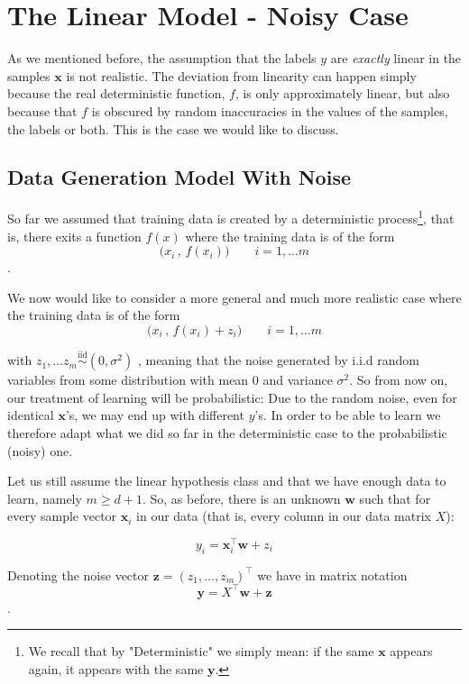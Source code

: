 \documentclass[11pt]{article}
\newcommand{\Tr}{\ensuremath{\top}}
\newcommand{\iid}{\stackrel{\text{iid}}{\sim}}
\begin{document}
\section{The Linear Model - Noisy Case }

As we mentioned before, the assumption that the labels $y$ are \textit{exactly} linear in the samples $\mathbf{x}$ is not realistic. The deviation from linearity can happen simply because the real deterministic function, $f$, is only approximately linear, but also because that $f$ is obscured by random inaccuracies in the values of the samples, the labels or both. This is the case we would like to discuss.

\subsection{Data Generation Model With Noise}

So far we assumed that training data is created by a deterministic process\footnote{We recall that by "Deterministic" we simply mean: if the same $\mathbf{x}$ appears again, it appears with the same $\mathbf{y}$.}, that is, there exits a function $f(x)$ where the training data is of the form
 \[
  \Big(x_i \,,\, f(x_i)\Big) \qquad i=1,\ldots m
 \].

We now would like to consider a more general and much more realistic case where the training data is of the form
  \[
  \Big(x_i \,,\, f(x_i) + z_i \Big) \qquad i=1,\ldots m
 \]

with $z_1,\ldots z_m\iid (0,\sigma^2)$ , meaning that the noise generated by i.i.d random variables from some distribution with mean $0$ and variance $\sigma^2$. So from now on, our treatment of learning will be probabilistic: Due to the random noise, even for identical $\mathbf{x}$'s, we may end up with different $y$'s. In order to be able to learn we therefore adapt what we did so far in the deterministic case to the probabilistic (noisy) one.

Let us still assume the linear hypothesis class and that we have enough data to learn, namely $m\geq d+1$. So, as before, there is an unknown $\mathbf{w}$ such that for every sample vector $\mathbf{x}_i$ in our data (that is, every column in our data matrix $X$):


$$y_i=\mathbf{x}_i^\Tr \mathbf{w}+z_i$$


Denoting the noise vector $\mathbf{z}=(z_1,\ldots,z_m)^\Tr$ we have in matrix notation
$$\mathbf{y}=X^\Tr\mathbf{w}+\mathbf{z}$$.
\end{document}
